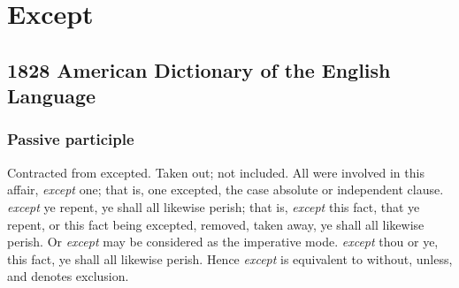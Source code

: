 \section{Except}
	\label{EXCEPT}
	

\subsection{1828 American Dictionary of the English Language} %
	\label{EXCEPT-1828}
	
	\subsubsection{Passive participle}
		\label{EXCEPT-1828-participle}

		\begin{compactitem}
			\item Contracted from excepted. Taken out; not included. All were involved in this affair, \textit{except} one; that is, one excepted, the case absolute or independent clause. \textit{except} ye repent, ye shall all likewise perish; that is, \textit{except} this fact, that ye repent, or this fact being excepted, removed, taken away, ye shall all likewise perish. Or \textit{except} may be considered as the imperative mode. \textit{except} thou or ye, this fact, ye shall all likewise perish. Hence \textit{except} is equivalent to without, unless, and denotes exclusion.
		\end{compactitem}




